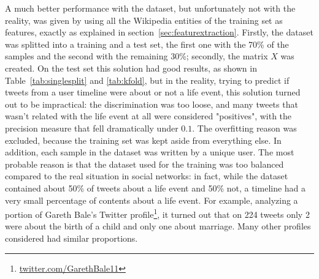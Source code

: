 \begin{table}[htbp]
\centering
{}\qquad\qquad
{}
\caption{The performance of the naive bayes were satisfactory on a very balanced dataset. Unfortunatly, users' timelines are very unbalanced, and this classifier turned out to be inappropriate.}
\end{table}

A much better performance with the dataset, but unfortunately not with the reality, was given by using all the Wikipedia entities of the training set as features, exactly as explained in section~\ref{sec:featurextraction}. Firstly, the dataset was splitted into a training and a test set, the first one with the 70\% of the samples and the second with the remaining 30\%; secondly, the matrix $X$ was created. On the test set this solution had good results, as shown in Table~\ref{tab:singlesplit} and \ref{tab:kfold}, but in the reality, trying to predict if tweets from a user timeline were about or not a life event, this solution turned out to be impractical: the discrimination was too loose, and many tweets that wasn't related with the life event at all were considered "positives", with the precision measure that fell dramatically under $0.1$. The overfitting reason was excluded, because the training set was kept aside from everything else. In addition, each sample in the dataset was written by a unique user. The most probable reason is that the dataset used for the training was too balanced compared to the real situation in social networks: in fact, while the dataset contained about 50\% of tweets about a life event and 50\% not, a timeline had a very small percentage of contents about a life event. For example, analyzing a portion of Gareth Bale's Twitter profile\footnote{\url{twitter.com/GarethBale11}}, it turned out that on 224 tweets only 2 were about the birth of a child and only one about marriage. Many other profiles considered had similar proportions.

